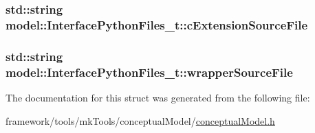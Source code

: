 \subsubsection[{\texorpdfstring{c\+Extension\+Source\+File}{cExtensionSourceFile}}]{\setlength{\rightskip}{0pt plus 5cm}std\+::string model\+::\+Interface\+Python\+Files\+\_\+t\+::c\+Extension\+Source\+File}\hypertarget{structmodel_1_1_interface_python_files__t_a00a2f580c3ce5af095671068af355dee}{}\label{structmodel_1_1_interface_python_files__t_a00a2f580c3ce5af095671068af355dee}
\subsubsection[{\texorpdfstring{wrapper\+Source\+File}{wrapperSourceFile}}]{\setlength{\rightskip}{0pt plus 5cm}std\+::string model\+::\+Interface\+Python\+Files\+\_\+t\+::wrapper\+Source\+File}\hypertarget{structmodel_1_1_interface_python_files__t_a5a4bb81312881768c054b4305b4f9f3d}{}\label{structmodel_1_1_interface_python_files__t_a5a4bb81312881768c054b4305b4f9f3d}


The documentation for this struct was generated from the following file\+:\begin{DoxyCompactItemize}
\item 
framework/tools/mk\+Tools/conceptual\+Model/\hyperlink{conceptual_model_8h}{conceptual\+Model.\+h}\end{DoxyCompactItemize}
